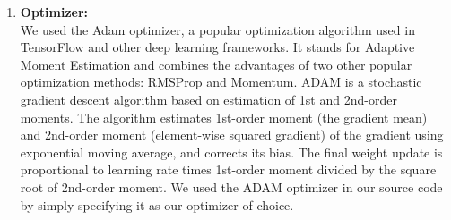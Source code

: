 \begin{enumerate}
\item \textbf{\large Optimizer:}\\
We used the Adam optimizer, a popular optimization algorithm used in TensorFlow and other deep learning frameworks. It stands for Adaptive Moment Estimation and combines the advantages of two other popular optimization methods: RMSProp and Momentum. ADAM is a stochastic gradient descent algorithm based on estimation of 1st and 2nd-order moments. The algorithm estimates 1st-order moment (the gradient mean) and 2nd-order moment (element-wise squared gradient) of the gradient using exponential moving average, and corrects its bias. The final weight update is proportional to learning rate times 1st-order moment divided by the square root of 2nd-order moment. We used the ADAM optimizer in our source code by simply specifying it as our optimizer of choice.


\end{enumerate}
